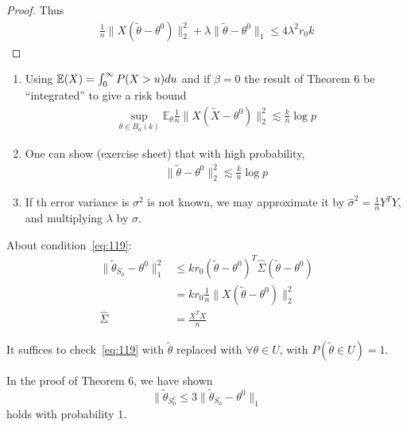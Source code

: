 \begin{proof}
  Thus
  \begin{align}
    \label{eq:133}
    \frac{1}{n} \| X(\tilde \theta - \theta^{0}) \|_{2}^{2} + \lambda
    \| \tilde \theta - \theta^{0} \|_{1} \leq 4 \lambda^{2} r_{0} k
  \end{align}
\end{proof}

\begin{remark}
  \begin{enumerate}
  \item Using $\E{X} = \int_{0}^{\infty}P(X > u) du$ and if $\beta =
    0$ the result of Theorem 6 be ``integrated'' to give a risk bound
    \begin{align}
      \label{eq:134}
      \sup_{\theta \in B_{n}(k)} \mathbb{E}_{\theta} \frac{1}{n} \|
      X(\tilde X - \theta^{0}) \|_{2}^{2} \lesssim \frac{k}{n} \log p
    \end{align}
  \item One can show (exercise sheet) that with high probability,
    \begin{align}
      \label{eq:135}
      \| \tilde \theta - \theta^{0} \|_{2}^{2} \lesssim \frac{k}{n}
      \log p
    \end{align}
  \item If th error variance is $\sigma^{2}$ is not known, we may
    approximate it by $\hat \sigma^{2} = \frac{1}{n} Y^{T} Y$, and
    multiplying $\lambda$ by $\hat \sigma$.
  \end{enumerate}
\end{remark}

About condition~\eqref{eq:119}:
\begin{align}
  \label{eq:137}
  \| \tilde \theta_{S_{0}} - \theta^{0} \|_{1}^{2} &\leq k r_{0}
  (\tilde \theta - \theta^{0})^{T} \hat \Sigma (\tilde \theta -
  \theta^{0}) \\
  &= k r_{0} \frac{1}{n} \| X(\tilde \theta - \theta^{0}) \|_{2}^{2} \\
  \hat \Sigma &= \frac{X^{T} X}{n}
\end{align}

It suffices to check~\eqref{eq:119} with $\tilde \theta$ replaced with
$\forall \theta \in U$, with $P(\tilde \theta \in U) = 1$.

In the proof of Theorem 6, we have shown
\begin{equation}
  \label{eq:138}
  \| \tilde \theta_{S_{0}^{c}} \leq 3 \| \tilde \theta_{S_{0}} -
  \theta^{0} \|_{1}
\end{equation} holds with probability 1.

